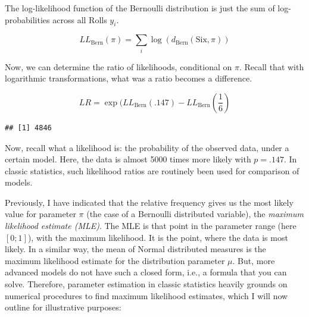 \documentclass[]{svmono}
\newenvironment{Shaded}{\begin{snugshade}}{\end{snugshade}}
\newcommand{\KeywordTok}[1]{\textcolor[rgb]{0.13,0.29,0.53}{\textbf{#1}}}
\newcommand{\DataTypeTok}[1]{\textcolor[rgb]{0.13,0.29,0.53}{#1}}
\newcommand{\DecValTok}[1]{\textcolor[rgb]{0.00,0.00,0.81}{#1}}
\newcommand{\StringTok}[1]{\textcolor[rgb]{0.31,0.60,0.02}{#1}}
\newcommand{\ControlFlowTok}[1]{\textcolor[rgb]{0.13,0.29,0.53}{\textbf{#1}}}
\newcommand{\OperatorTok}[1]{\textcolor[rgb]{0.81,0.36,0.00}{\textbf{#1}}}
\newcommand{\NormalTok}[1]{#1}
\begin{document}
The log-likelihood function of the Bernoulli distribution is just the
sum of log-probabilities across all Rolls \(y_i\).

\[
LL_\text{Bern}(\pi) = \sum_i{\log(d_\text{Bern}(\text{Six},\pi))}
\]

Now, we can determine the ratio of likelihoods, conditional on \(\pi\).
Recall that with logarithmic transformations, what was a ratio becomes a
difference.

\[
LR = \exp(LL_\text{Bern}(.147) - LL_\text{Bern}(\frac 1 6)
\]

\begin{Shaded}
\end{Shaded}

\begin{verbatim}
## [1] 4846
\end{verbatim}

Now, recall what a likelihood is: the probability of the observed data,
under a certain model. Here, the data is almost 5000 times more likely
with \(p = .147\). In classic statistics, such likelihood ratios are
routinely been used for comparison of models.

Previously, I have indicated that the relative frequency gives us the
most likely value for parameter \(\pi\) (the case of a Bernoulli
distributed variable), the \emph{maximum likelihood estimate (MLE)}. The
MLE is that point in the parameter range (here \([0;1]\)), with the
maximum likelihood. It is the point, where the data is most likely. In a
similar way, the mean of Normal distributed measures is the maximum
likelihood estimate for the distribution parameter \(\mu\). But, more
advanced models do not have such a closed form, i.e., a formula that you
can solve. Therefore, parameter estimation in classic statistics heavily
grounds on numerical procedures to find maximum likelihood estimates,
which I will now outline for illustrative purposes:
\end{document}
